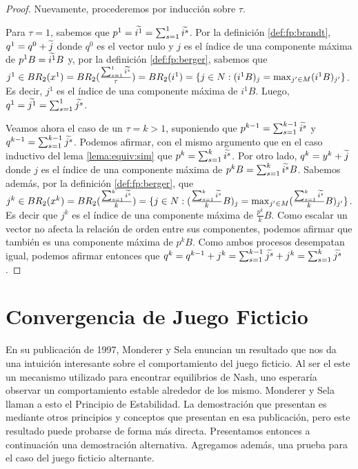 \begin{proof}
    Nuevamente, procederemos por inducción sobre $\tau$.

    Para $\tau = 1$, sabemos que $p^1 = \widetilde{i^1} = \sum_{s=1}^1{\widetilde{i^s}}$. Por la definición \ref{def:fp:brandt}, $q^1 = q^0 + \widetilde{j}$ donde $q^0$ es el vector nulo y $j$ es el índice de una componente máxima de $p^{1}B = \widetilde{i^1}B$ y, por la definición \ref{def:fp:berger}, sabemos que $j^1 \in BR_2(x^1) = BR_2(\frac{\sum^1_{s=1} \widetilde{i^s}}{\tau}) = BR_2(i^1) = \{j \in N : (i^{1}B)_j = \max_{j' \in M} (i^{1}B)_{j'}\}$. Es decir, $j^1$ es el índice de una componente máxima de $i^{1}B$. Luego, $q^1 = \widetilde{j^1} = \sum_{s=1}^1{\widetilde{j^s}}$.

    Veamos ahora el caso de un $\tau = k > 1$, suponiendo que $p^{k-1} = \sum_{s=1}^{k-1}{\widetilde{i^s}}$ y $q^{k-1} = \sum_{s=1}^{k-1}{\widetilde{j^s}}$. Podemos afirmar, con el mismo argumento que en el caso inductivo del lema \ref{lema:equiv:sim} que $p^{k} = \sum_{s=1}^k{\widetilde{i^s}}$. Por otro lado, $q^{k} = y^{k} + \widetilde{j}$ donde $j$ es el índice de una componente máxima de $p^{k}B = \sum_{s=1}^k{\widetilde{i^s}}B$. Sabemos además, por la definición \ref{def:fp:berger}, que $j^k \in BR_2(x^{k}) = BR_2(\frac{\sum_{s=1}^{k}{\widetilde{i^s}}}{k}) = \{j \in N : (\frac{\sum_{s=1}^{k}{\widetilde{i^s}}}{k}B)_j = \max_{j' \in M} (\frac{\sum_{s=1}^{k}{\widetilde{i^s}}}{k}B)_{j'}\}$. Es decir que $j^k$ es el índice de una componente máxima de $\frac{p^k}{k}B$. Como escalar un vector no afecta la relación de orden entre sus componentes, podemos afirmar que también es una componente máxima de $p^{k}B$. Como ambos procesos desempatan igual, podemos afirmar entonces que $q^k = q^{k-1} + j^k = \sum_{s=1}^{k-1}{\widetilde{j^s}} + j^k = \sum_{s=1}^{k}{\widetilde{j^s}}$.

\end{proof}

\section{Convergencia de Juego Ficticio}

En su publicación de 1997, Monderer y Sela \cite{no:cycling} enuncian un resultado que nos da una intuición interesante sobre el comportamiento del juego ficticio. Al ser el este un mecanismo utilizado para encontrar equilibrios de Nash, uno esperaría observar un comportamiento estable alrededor de los mismo. Monderer y Sela llaman a esto el Principio de Estabilidad. La demostración que presentan es mediante otros principios y conceptos que presentan en esa publicación, pero este resultado puede probarse de forma más directa. Presentamos entonces a continuación una demostración alternativa. Agregamos además, una prueba para el caso del juego ficticio alternante.

